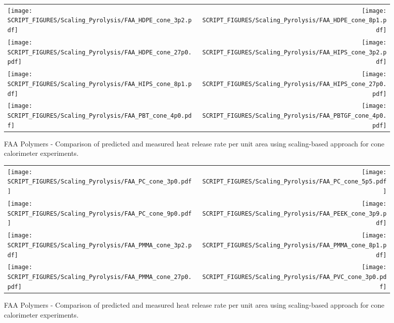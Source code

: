 \begin{figure}[p]
\begin{tabular*}{\textwidth}{l@{\extracolsep{\fill}}r}
\texttt{[image: SCRIPT\_FIGURES/Scaling\_Pyrolysis/FAA\_HDPE\_cone\_3p2.pdf]} &
\texttt{[image: SCRIPT\_FIGURES/Scaling\_Pyrolysis/FAA\_HDPE\_cone\_8p1.pdf]} \\
\texttt{[image: SCRIPT\_FIGURES/Scaling\_Pyrolysis/FAA\_HDPE\_cone\_27p0.pdf]} &
\texttt{[image: SCRIPT\_FIGURES/Scaling\_Pyrolysis/FAA\_HIPS\_cone\_3p2.pdf]} \\
\texttt{[image: SCRIPT\_FIGURES/Scaling\_Pyrolysis/FAA\_HIPS\_cone\_8p1.pdf]} &
\texttt{[image: SCRIPT\_FIGURES/Scaling\_Pyrolysis/FAA\_HIPS\_cone\_27p0.pdf]} \\
\texttt{[image: SCRIPT\_FIGURES/Scaling\_Pyrolysis/FAA\_PBT\_cone\_4p0.pdf]} &
\texttt{[image: SCRIPT\_FIGURES/Scaling\_Pyrolysis/FAA\_PBTGF\_cone\_4p0.pdf]} \\
\end{tabular*}
\caption[HRRPUA of FAA Polymers using scaling model]
{FAA Polymers - Comparison of predicted and measured heat release rate per unit area using scaling-based approach for cone calorimeter experiments.}
\label{FAA_Polymers_HRR_Polymers1}
\end{figure}

\begin{figure}[p]
\begin{tabular*}{\textwidth}{l@{\extracolsep{\fill}}r}
\texttt{[image: SCRIPT\_FIGURES/Scaling\_Pyrolysis/FAA\_PC\_cone\_3p0.pdf]} &
\texttt{[image: SCRIPT\_FIGURES/Scaling\_Pyrolysis/FAA\_PC\_cone\_5p5.pdf]} \\
\texttt{[image: SCRIPT\_FIGURES/Scaling\_Pyrolysis/FAA\_PC\_cone\_9p0.pdf]} &
\texttt{[image: SCRIPT\_FIGURES/Scaling\_Pyrolysis/FAA\_PEEK\_cone\_3p9.pdf]} \\
\texttt{[image: SCRIPT\_FIGURES/Scaling\_Pyrolysis/FAA\_PMMA\_cone\_3p2.pdf]} &
\texttt{[image: SCRIPT\_FIGURES/Scaling\_Pyrolysis/FAA\_PMMA\_cone\_8p1.pdf]} \\
\texttt{[image: SCRIPT\_FIGURES/Scaling\_Pyrolysis/FAA\_PMMA\_cone\_27p0.pdf]} &
\texttt{[image: SCRIPT\_FIGURES/Scaling\_Pyrolysis/FAA\_PVC\_cone\_3p0.pdf]} \\
\end{tabular*}
\caption[HRRPUA of FAA Polymers using scaling model]
{FAA Polymers - Comparison of predicted and measured heat release rate per unit area using scaling-based approach for cone calorimeter experiments.}
\label{FAA_Polymers_HRR_Polymers2}
\end{figure}


